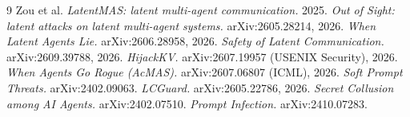 \documentclass{article}
\begin{document}
\begin{thebibliography}{9}
 Zou et al. \emph{LatentMAS: latent multi-agent communication.} 2025.
 \emph{Out of Sight: latent attacks on latent multi-agent systems.} arXiv:2605.28214, 2026.
 \emph{When Latent Agents Lie.} arXiv:2606.28958, 2026.
 \emph{Safety of Latent Communication.} arXiv:2609.39788, 2026.
 \emph{HijackKV.} arXiv:2607.19957 (USENIX Security), 2026.
 \emph{When Agents Go Rogue (AcMAS).} arXiv:2607.06807 (ICML), 2026.
 \emph{Soft Prompt Threats.} arXiv:2402.09063.
 \emph{LCGuard.} arXiv:2605.22786, 2026.
 \emph{Secret Collusion among AI Agents.} arXiv:2402.07510.
 \emph{Prompt Infection.} arXiv:2410.07283.
\end{thebibliography}
\end{document}
